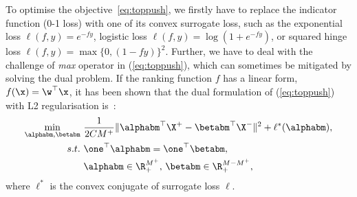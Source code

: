 To optimise the objective~\ref{eq:toppush}, 
we firstly have to replace the indicator function (0-1 loss) with one of its convex surrogate loss,
such as the exponential loss $\ell(f, y) = e^{-fy}$, logistic loss $\ell(f, y) = \log(1 + e^{-fy})$, 
or squared hinge loss $\ell(f, y) = \max\{0, (1 - fy)\}^2$.
Further, we have to deal with the challenge of \emph{max} operator in (\ref{eq:toppush}), which can sometimes be mitigated by solving the dual problem.
If the ranking function $f$ has a linear form, \ie $f(\x) = \w^\top \x$, it has been shown that the dual formulation of (\ref{eq:toppush}) 
with L2 regularisation is~\cite{li2014top}:
\begin{equation*}
\begin{aligned}
\min_{\alphabm, \betabm} \ & \frac{1}{2 C M^+} \| \alphabm^\top \X^+ - \betabm^\top \X^- \|^2 + \ell^*(\alphabm), \\
s.t. \ & \one^\top \alphabm = \one^\top \betabm, \\
       & \alphabm \in \R_+^{M^+}, \, \betabm \in \R_+^{M-M^+},
\end{aligned}
\end{equation*}
where $\ell^*$ is the convex conjugate of surrogate loss $\ell$.


